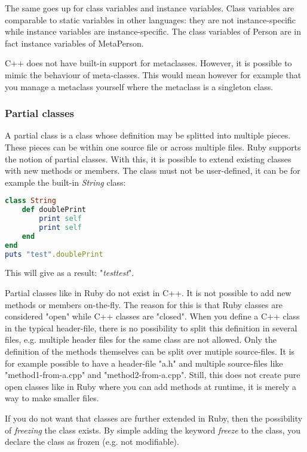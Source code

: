 \documentclass[10pt,a4paper,twocolumn]{article}
\begin{document}
The same goes up for class variables and instance variables. Class variables are comparable to static variables in other languages: they are not instance-specific while instance variables are instance-specific. The class variables of Person are in fact instance variables of MetaPerson.

C++ does not have built-in support for metaclasses. However, it is possible to mimic the behaviour of meta-classes. This would mean however for example that you manage a metaclass yourself where the metaclass is a singleton class.

\subsubsection{Partial classes}
A partial class is a class whose definition may be splitted into multiple pieces. These pieces can be within one source file or across multiple files. Ruby supports the notion of partial classes. With this, it is possible to extend existing classes with new methods or members. The class must not be user-defined, it can be for example the built-in \textit{String} class: 

\begin{lstlisting}[language=Ruby]
class String
	def doublePrint
		print self
		print self
	end
end
puts "test".doublePrint
\end{lstlisting}

This will give as a result: "\textit{testtest}".

Partial classes like in Ruby do not exist in C++. It is not possible to add new methods or members on-the-fly. The reason for this is that Ruby classes are considered "open" while C++ classes are "closed". When you define a C++ class in the typical header-file, there is no possibility to split this definition in several files, e.g. multiple header files for the same class are not allowed. Only the definition of the methods themselves can be split over mutiple source-files. It is for example possible to have a header-file "a.h" and multiple source-files like "method1-from-a.cpp" and "method2-from-a.cpp". Still, this does not create pure open classes like in Ruby where you can add methods at runtime, it is merely a way to make smaller files.

If you do not want that classes are further extended in Ruby, then the possibility of \textit{freezing} the class exists. By simple adding the keyword \textit{freeze} to the class, you declare the class as frozen (e.g. not modifiable).
\end{document}
